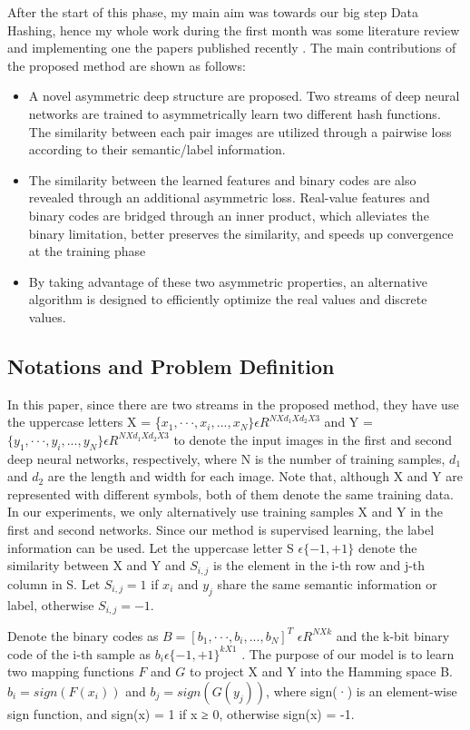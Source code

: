 \documentclass[12pt, a4paper,twoside]{article}
\begin{document}
\label{sec:workDone8thSem}
After the start of this phase, my main aim was towards our big step Data Hashing, hence my whole work during the first month was some literature review and implementing one the papers published recently \cite{DeepHashing}.
The main contributions of the proposed method are shown as follows:
\begin{itemize}
	\item  A novel asymmetric deep structure are proposed. Two streams of deep neural networks are trained to asymmetrically
	learn two different hash functions. The similarity between each pair images are utilized through a pairwise loss according to
	their semantic/label information.
	\item The similarity between the learned features and binary codes are also revealed through an additional asymmetric loss.
	Real-value features and binary codes are bridged through an inner product, which alleviates the binary limitation, better
	preserves the similarity, and speeds up convergence at the training phase
	\item  By taking advantage of these two asymmetric properties, an alternative algorithm is designed to efficiently optimize the
	real values and discrete values.
\end{itemize}
\subsection{Notations and Problem Definition}
In this paper, since there are two streams in the proposed method, they have use the uppercase letters
X = \{$x_{1} , · · · , x_{i} , . . . , x_{N} \}  \epsilon  R^{NXd_{1}Xd_{2}X3}$ and Y = $\{y_{1} , · · · , y_{i}, . . . , y_{N} \} \epsilon R^{NXd_{1}Xd_{2}X3}$  to denote the input images in the first and second deep neural networks, respectively, where N is the number of training samples,
$d_{1}$ and $d_{2}$ are the length and width for each image. Note that, although X and Y are represented with different
symbols, both of them denote the same training data. In our experiments, we only alternatively use training samples X
and Y in the first and second networks. Since our method is supervised learning, the label information can be used.
Let the uppercase letter S $\epsilon \{−1, +1\}$ denote the similarity between X and Y and $S_{i,j}$ is the element in the i-th row and
j-th column in S. Let $S_{i,j} = 1$ if $x_{i}$ and $y_{j}$ share the same semantic information or label, otherwise $S_{i,j} = −1$.

Denote the binary codes as $B = [b_{1} , · · · , b_{i}, . . . , b_{N} ]^T$	 $\epsilon R^{NXk} $
 and the k-bit binary code of the i-th sample as $b_{i} \epsilon \{−1, +1\}^{kX1}$ . The purpose of our model is to learn
two mapping functions $F$ and $G$ to project X and Y into the Hamming space B. $b_{i} = sign(F(x_{i} ))$ and $b_{j} = sign(G(y_{j} ))$,
where sign(·) is an element-wise sign function, and sign(x) =
1 if x ≥ 0, otherwise sign(x) = -1.
\end{document}

